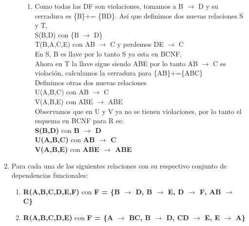 \documentclass{article}
\begin{document}
\begin{enumerate}
\begin{itemize}
\begin{enumerate}
		\item Como todas las DF son violaciones, tomamos a B $\rightarrow$ D y su cerradura es  \{B\}+= \{BD\}.
		Así que definimos dos nuevas relaciones S y T,\\
		S(B,D) con \{B $\rightarrow$ D\}\\
		T(B,A,C,E) con AB $\rightarrow$ C y perdemos DE $\rightarrow$ C\\
		En S, B es llave por lo tanto  S ya esta en BCNF.\\
		Ahora en T la llave sigue siendo ABE por lo tanto  AB $\rightarrow$ C es violación, calculamos la cerradura para \{AB\}+=\{ABC\}\\
		Definimos otras dos nuevas relaciones\\
		U(A,B,C) con AB $\rightarrow$ C\\
		V(A,B,E) con ABE $\rightarrow$ ABE\\
		Observamos que en U y V ya no se tienen violaciones, por lo tanto el esquema en BCNF para R es:\\
		\textbf{S(B,D)} con \textbf{B $\rightarrow$ D}\\
		\textbf{U(A,B,C)} con \textbf{AB $\rightarrow$ C}\\
		\textbf{V(A,B,E)} con \textbf{ABE $\rightarrow$ ABE}\\ 
		
	\end{enumerate}
\end{itemize}
   
   \item Para  cada una  de  las  siguientes  relaciones  con  su  respectivo  conjunto  de  dependencias funcionales:
   \begin{enumerate}
   	\item \textbf{R(A,B,C,D,E,F)} con \textbf{F = \{B $\rightarrow$ D, B $\rightarrow$ E, D $\rightarrow$ F, AB $\rightarrow$ C\}}
   	\item \textbf{R(A,B,C,D,E)} con \textbf{F = \{A $\rightarrow$ BC, B $\rightarrow$ D, CD $\rightarrow$ E, E $\rightarrow$ A\}}
   \end{enumerate}


\end{enumerate}
\end{document}
